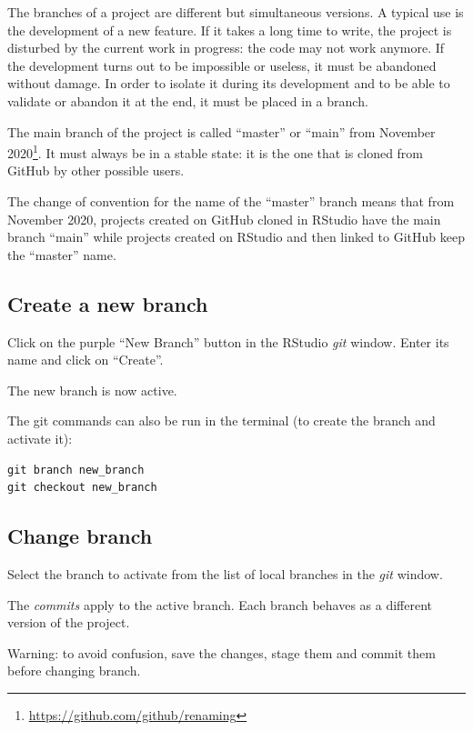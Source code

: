 \documentclass[
  12pt,
  american,
  a4paper,
  extrafontsizes,onecolumn,openright
  ]{memoir}
\begin{document}
The branches of a project are different but simultaneous versions.
A typical use is the development of a new feature.
If it takes a long time to write, the project is disturbed by the current work in progress: the code may not work anymore.
If the development turns out to be impossible or useless, it must be abandoned without damage.
In order to isolate it during its development and to be able to validate or abandon it at the end, it must be placed in a branch.

The main branch of the project is called \enquote{master} or \enquote{main} from November 2020\footnote{\url{https://github.com/github/renaming}}.
It must always be in a stable state: it is the one that is cloned from GitHub by other possible users.

The change of convention for the name of the \enquote{master} branch means that from November 2020, projects created on GitHub cloned in RStudio have the main branch \enquote{main} while projects created on RStudio and then linked to GitHub keep the \enquote{master} name.

\subsection{Create a new branch}\label{create-a-new-branch}

Click on the purple \enquote{New Branch} button in the RStudio \emph{git} window.
Enter its name and click on \enquote{Create}.

The new branch is now active.

The git commands can also be run in the terminal (to create the branch and activate it):

\begin{verbatim}
git branch new_branch
git checkout new_branch
\end{verbatim}

\subsection{Change branch}\label{change-branch}

Select the branch to activate from the list of local branches in the \emph{git} window.

The \emph{commits} apply to the active branch.
Each branch behaves as a different version of the project.

Warning: to avoid confusion, save the changes, stage them and commit them before changing branch.
\end{document}
